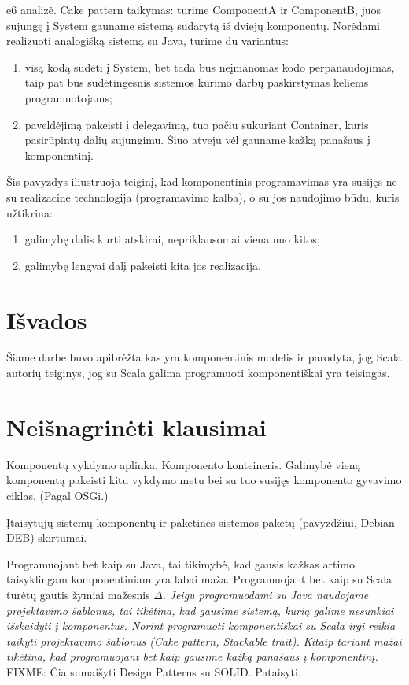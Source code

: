 e6 analizė. Cake pattern taikymas: turime ComponentA ir ComponentB,
juos sujungę į System gauname sistemą sudarytą iš dviejų komponentų.
Norėdami realizuoti analogišką sistemą su Java, turime du variantus:
\begin{enumerate}
  \item visą kodą sudėti į System, bet tada bus neįmanomas kodo
    perpanaudojimas, taip pat bus sudėtingesnis sistemos kūrimo
    darbų paskirstymas keliems programuotojams;
  \item \label{scala:exmp:enum:2} paveldėjimą pakeisti į delegavimą,
    tuo pačiu sukuriant Container, kuris pasirūpintų dalių
    sujungimu. Šiuo atveju vėl gauname kažką panašaus į
    komponentinį.
\end{enumerate}

Šis pavyzdys iliustruoja teiginį, kad komponentinis programavimas yra
susijęs ne su realizacine technologija (programavimo kalba), o su
jos naudojimo būdu, kuris užtikrina:
\begin{enumerate}
  \item galimybę dalis kurti atskirai, nepriklausomai viena nuo kitos;
  \item galimybę lengvai dalį pakeisti kita jos realizacija.
\end{enumerate}

\chapter{Išvados}

Šiame darbe buvo apibrėžta kas yra komponentinis modelis ir parodyta,
jog Scala autorių teiginys, jog su Scala galima programuoti
komponentiškai yra teisingas.

\chapter{Neišnagrinėti klausimai}

Komponentų vykdymo aplinka. Komponento konteineris. Galimybė vieną
komponentą pakeisti kitu vykdymo metu bei su tuo susijęs komponento
gyvavimo ciklas. (Pagal OSGi.)

Įtaisytųjų  sistemų komponentų ir paketinės sistemos
paketų (pavyzdžiui, Debian DEB) skirtumai.

Programuojant bet kaip su Java, tai tikimybė, kad gausis kažkas artimo
taisyklingam komponentiniam yra labai maža. Programuojant bet kaip su
Scala turėtų gautis žymiai mažesnis $\Delta$. \emph{Jeigu programuodami
su Java naudojame projektavimo šablonus, tai tikėtina, kad gausime
sistemą, kurią galime nesunkiai išskaidyti į komponentus. Norint
programuoti komponentiškai su Scala irgi reikia taikyti projektavimo
šablonus (Cake pattern, Stackable trait). Kitaip tariant mažai tikėtina,
kad programuojant bet kaip gausime kažką panašaus į komponentinį.}
FIXME: Čia sumaišyti Design Patterns su SOLID. Pataisyti.

